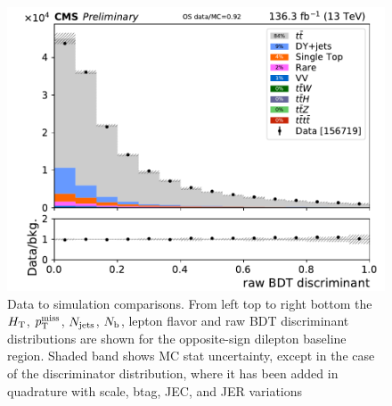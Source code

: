 \begin{figure}[!htb]
\includegraphics[width=0.30\linewidth]{figs/ftan/cr/run2_os_eventbdt_in.pdf} 
\caption{ Data to simulation comparisons. From left top to right bottom
  the $H_{\mathrm{T}}$, $p_{\mathrm{T}}^\text{miss}$, $N_\text{jets}$, $N_\mathrm{b}$, lepton flavor and raw BDT discriminant distributions are
shown for the opposite-sign dilepton baseline region. Shaded band shows MC stat uncertainty,
except in the case of the discriminator distribution, where it has been added in quadrature with
    scale, btag, JEC, and JER variations}
\label{fig:OSBaselineRun2}
\end{figure}


